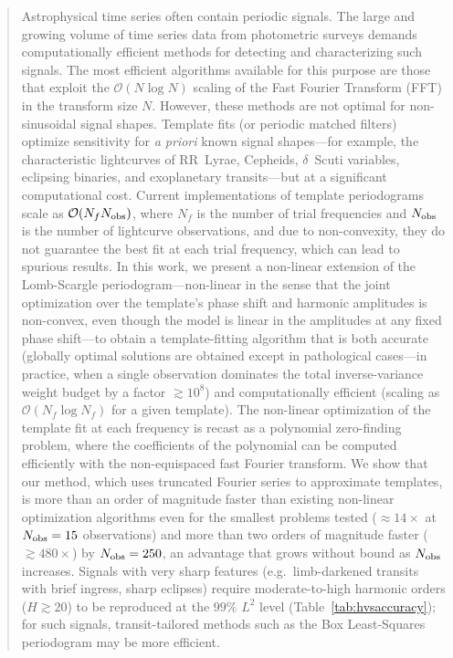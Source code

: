 \documentclass[apj]{emulateapj}
\newcommand{\bigO}{\mathcal{O}}
\begin{document}
\begin{abstract}
    Astrophysical time series often contain periodic signals. The large and growing volume of time series data from
    photometric surveys demands computationally efficient methods for detecting and characterizing such signals.
    The most efficient algorithms available for this purpose are those that exploit the
    $\bigO(N\log N)$ scaling of the Fast Fourier Transform (FFT) in the transform size $N$. However, these methods are not optimal
    for non-sinusoidal signal shapes. Template fits (or periodic matched filters) optimize
    sensitivity for \emph{a priori} known signal shapes---for example, the characteristic lightcurves of RR~Lyrae,
    Cepheids, $\delta$~Scuti variables, eclipsing binaries, and exoplanetary transits---but at a significant computational cost. Current
    implementations of template periodograms scale as $\bigO(N_f N_{\rm obs})$, where $N_f$ is the number
    of trial frequencies and $N_{\rm obs}$ is the number of lightcurve observations, and due to non-convexity, they do not
    guarantee the best fit at each trial frequency, which can lead to spurious results. In this work, we present a non-linear extension of the Lomb-Scargle
    periodogram---non-linear in the sense that the joint optimization over the template's phase shift and harmonic amplitudes is non-convex, even though the model is linear in the amplitudes at any fixed phase shift---to obtain a template-fitting algorithm that is both accurate (globally optimal solutions are
    obtained except in pathological cases---in practice, when a single observation dominates the total inverse-variance weight budget by a factor $\gtrsim 10^8$) and computationally efficient (scaling as $\bigO(N_f\log N_f)$ for a given template).
    The non-linear optimization of the template fit at each frequency is recast as a polynomial
    zero-finding problem, where the coefficients of the polynomial can be computed efficiently with
    the non-equispaced fast Fourier transform. We show that our method, which uses truncated Fourier series to approximate templates,
    is more than an order of magnitude faster than existing non-linear optimization algorithms even for the smallest problems tested
    ($\approx 14\times$ at $N_{\rm obs} = 15$ observations) and more than two orders of magnitude faster ($\gtrsim 480\times$) by
    $N_{\rm obs} = 250$, an advantage that grows without bound as $N_{\rm obs}$ increases.
    Signals with very sharp features (e.g.\ limb-darkened transits with brief ingress, sharp eclipses) require moderate-to-high harmonic orders ($H\gtrsim 20$) to be reproduced at the $99\%$ $L^2$ level (Table~\ref{tab:hvsaccuracy}); for such signals, transit-tailored methods such as the Box Least-Squares periodogram may be more efficient.

\end{abstract}
\end{document}
